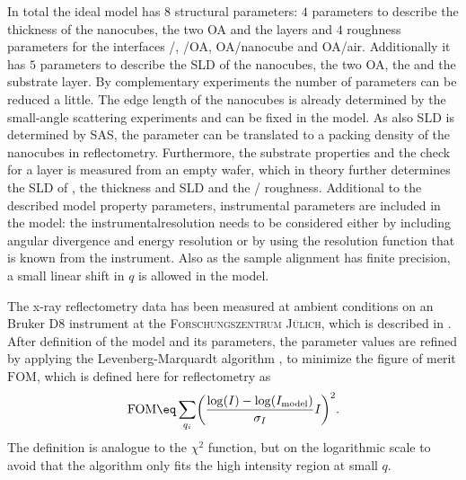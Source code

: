 \documentclass[\main/dresen_thesis.tex]{subfiles}
\begin{document}
  In total the ideal model has $8$ structural parameters: $4$ parameters to describe the thickness of the nanocubes, the two OA and the  layers and $4$ roughness parameters for the interfaces /, /OA, OA/nanocube and OA/air.
  Additionally it has $5$ parameters to describe the SLD of the nanocubes, the two OA, the  and the substrate layer.
  By complementary experiments the number of parameters can be reduced a little.
  The edge length of the nanocubes is already determined by the small-angle scattering experiments and can be fixed in the model.
  As also SLD is determined by SAS, the parameter can be translated to a packing density of the nanocubes in reflectometry.
  Furthermore, the substrate properties and the check for a  layer is measured from an empty wafer, which in theory further determines the SLD of , the  thickness and SLD and the / roughness.
  Additional to the described model property parameters, instrumental parameters are included in the model: the instrumentalresolution needs to be considered either by including angular divergence and energy resolution or by using the resolution function that is known from the instrument.
  Also as the sample alignment has finite precision, a small linear shift in $q$ is allowed in the model.

  The x-ray reflectometry data has been measured at ambient conditions on an Bruker D8 instrument at the \textsc{Forschungszentrum J\"ulich}, which is described in .
  After definition of the model and its parameters, the parameter values are refined by applying the Levenberg-Marquardt algorithm \cite{Marquardt_1963_Analgo}, to minimize the figure of merit $\mathrm{FOM}$, which is defined here for reflectometry as
  \begin{align}
    \mathrm{FOM} \eq \sum_{q_i} \biggl( \frac{\log(I) - \log(I_\mathrm{model})}{\sigma_{I}} I\biggr)^2.
  \end{align}
  The definition is analogue to the $\chi^2$ function, but on the logarithmic scale to avoid that the algorithm only fits the high intensity region at small $q$.
\end{document}
